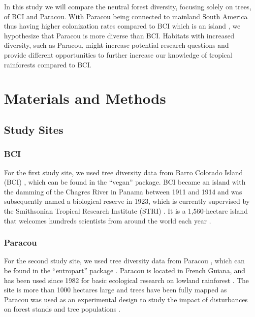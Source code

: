 \documentclass[fleqn,10pt]{ArtEcoFoG} %
\begin{document}
In this study we will compare the neutral forest diversity, focusing
solely on trees, of BCI and Paracou. With Paracou being connected to
mainland South America thus having higher colonization rates compared to
BCI which is an island \citep{BRV:BRV510}, we hypothesize that Paracou
is more diverse than BCI. Habitats with increased diversity, such as
Paracou, might increase potential research questions and provide
different opportunities to further increase our knowledge of tropical
rainforests compared to BCI.

\section{Materials and Methods}\label{materials-and-methods}

\subsection{Study Sites}\label{study-sites}

\subsubsection{BCI}\label{bci}

For the first study site, we used tree diversity data from Barro
Colorado Island (BCI) \citep{croat1978flora}, which can be found in the
``vegan'' package\citep{oksanen2010vegan}. BCI became an island with the
damming of the Chagres River in Panama between 1911 and 1914 and was
subsequently named a biological reserve in 1923, which is currently
supervised by the Smithsonian Tropical Research Institute (STRI)
\citep{croat1978flora, leigh1999tropical}. It is a 1,560-hectare island
that welcomes hundreds scientists from around the world each year
\citep{croat1978flora}.

\subsubsection{Paracou}\label{paracou}

For the second study site, we used tree diversity data from Paracou
\citep{Degen2006}, which can be found in the ``entropart'' package
\citep{Marcon2014c}. Paracou is located in French Guiana, and has been
used since 1982 for basic ecological research on lowland rainforest
\citep{Gourlet-Fleury2004}. The site is more than 1000 hectares large
and trees have been fully mapped as Paracou was used as an experimental
design to study the impact of disturbances on forest stands and tree
populations \citep{Gourlet-Fleury2004}.
\end{document}
